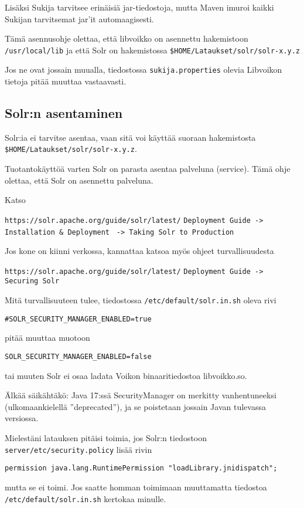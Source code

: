 \documentclass[12pt]{article}
\begin{document}
Lisäksi Sukija tarvitsee erinäisiä jar-tiedostoja, mutta Maven imuroi
kaikki Sukijan tarvitsemat jar'it automaagisesti.

Tämä asennusohje olettaa, että libvoikko on asennettu hakemistoon
\verb=/usr/local/lib= ja että Solr on hakemistossa
\verb=$HOME/Lataukset/solr/solr-x.y.z=

Jos ne ovat jossain muualla, tiedostossa \verb=sukija.properties=
olevia Libvoikon tietoja pitää muuttaa vastaavasti.


\newpage
\subsection*{Solr:n asentaminen}

Solr:ia ei tarvitse asentaa, vaan sitä voi käyttää suoraan
hakemistosta \verb=$HOME/Lataukset/solr/solr-x.y.z=.

Tuotantokäyttöä varten Solr on parasta asentaa palveluna (service).
Tämä ohje olettaa, että Solr on asennettu palveluna.

Katso

\verb=https://solr.apache.org/guide/solr/latest/=
\verb=Deployment Guide -> Installation & Deployment=
\verb= -> Taking Solr to Production=


Jos kone on kiinni verkossa, kannattaa katsoa myös ohjeet turvallisuudesta

\verb=https://solr.apache.org/guide/solr/latest/=
\verb=Deployment Guide -> Securing Solr=

Mitä turvallisuuteen tulee,
tiedostossa \verb|/etc/default/solr.in.sh| oleva rivi

\verb|#SOLR_SECURITY_MANAGER_ENABLED=true|

pitää muuttaa muotoon

\verb|SOLR_SECURITY_MANAGER_ENABLED=false|

tai muuten Solr ei osaa ladata Voikon binaaritiedostoa libvoikko.so.


\bigskip\noindent
Älkää säikähtäkö: Java 17:ssä SecurityManager on merkitty
vanhentuneeksi (ulkomaankielellä ''deprecated''), ja se poistetaan
jossain Javan tulevassa versiossa.

Mielestäni latauksen pitäisi toimia, jos Solr:n tiedostoon
\verb=server/etc/security.policy= lisää rivin

\verb|permission java.lang.RuntimePermission "loadLibrary.jnidispatch";|

mutta se ei toimi. Jos saatte homman toimimaan muuttamatta tiedostoa
\verb|/etc/default/solr.in.sh| kertokaa minulle.
\end{document}
